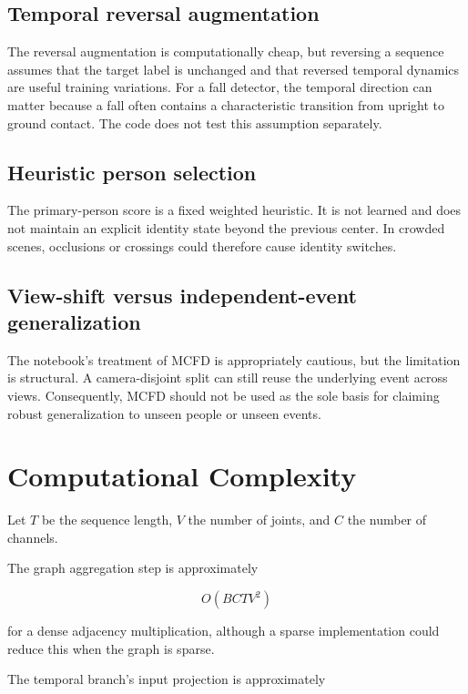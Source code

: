 \documentclass[11pt,a4paper]{article}
\begin{document}
\subsection{Temporal reversal augmentation}

The reversal augmentation is computationally cheap, but reversing a sequence assumes that the target label is unchanged and that reversed temporal dynamics are useful training variations. For a fall detector, the temporal direction can matter because a fall often contains a characteristic transition from upright to ground contact. The code does not test this assumption separately.

\subsection{Heuristic person selection}

The primary-person score is a fixed weighted heuristic. It is not learned and does not maintain an explicit identity state beyond the previous center. In crowded scenes, occlusions or crossings could therefore cause identity switches.

\subsection{View-shift versus independent-event generalization}

The notebook's treatment of MCFD is appropriately cautious, but the limitation is structural. A camera-disjoint split can still reuse the underlying event across views. Consequently, MCFD should not be used as the sole basis for claiming robust generalization to unseen people or unseen events.

\section{Computational Complexity}

Let $T$ be the sequence length, $V$ the number of joints, and $C$ the number of channels.

The graph aggregation step is approximately

\begin{equation}
O(BCTV^2)
\end{equation}

for a dense adjacency multiplication, although a sparse implementation could reduce this when the graph is sparse.

The temporal branch's input projection is approximately
\end{document}
